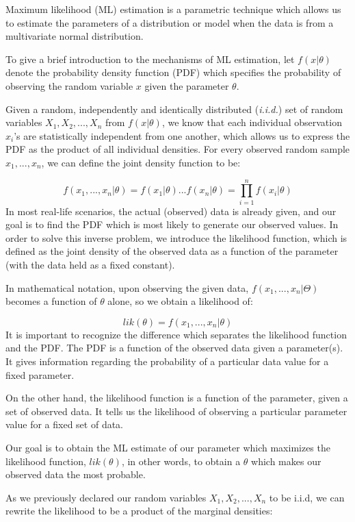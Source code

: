 \documentclass[
]{article}
\begin{document}
Maximum likelihood (ML) estimation is a parametric technique which
allows us to estimate the parameters of a distribution or model when the
data is from a multivariate normal distribution.

To give a brief introduction to the mechanisms of ML estimation, let
\(f(x|\theta)\) denote the probability density function (PDF) which
specifies the probability of observing the random variable \(x\) given
the parameter \(\theta\).

Given a random, independently and identically distributed
(\emph{i.i.d.}) set of random variables \(X_1, X_2,...,X_n\) from
\(f(x|\theta)\), we know that each individual observation \(x_i\)'s are
statistically independent from one another, which allows us to express
the PDF as the product of all individual densities. For every observed
random sample \(x_1,...,x_n\), we can define the joint density function
to be:

\[f(x_1,...,x_n|\theta) = f(x_1|\theta)...f(x_n|\theta) = \prod_{i=1}^{n}f(x_i|\theta)\]
In most real-life scenarios, the actual (observed) data is already
given, and our goal is to find the PDF which is most likely to generate
our observed values. In order to solve this inverse problem, we
introduce the likelihood function, which is defined as the joint density
of the observed data as a function of the parameter (with the data held
as a fixed constant).

In mathematical notation, upon observing the given data,
\(f(x_1,...,x_n|\Theta)\) becomes a function of \(\theta\) alone, so we
obtain a likelihood of:

\[lik(\theta) = f(x_1,...,x_n|\theta)\] It is important to recognize the
difference which separates the likelihood function and the PDF. The PDF
is a function of the observed data given a parameter(s). It gives
information regarding the probability of a particular data value for a
fixed parameter.

On the other hand, the likelihood function is a function of the
parameter, given a set of observed data. It tells us the likelihood of
observing a particular parameter value for a fixed set of data.

Our goal is to obtain the ML estimate of our parameter which maximizes
the likelihood function, \(lik(\theta)\), in other words, to obtain a
\(\theta\) which makes our observed data the most probable.

As we previously declared our random variables \(X_1, X_2,...,X_n\) to
be i.i.d, we can rewrite the likelihood to be a product of the marginal
densities:
\end{document}
